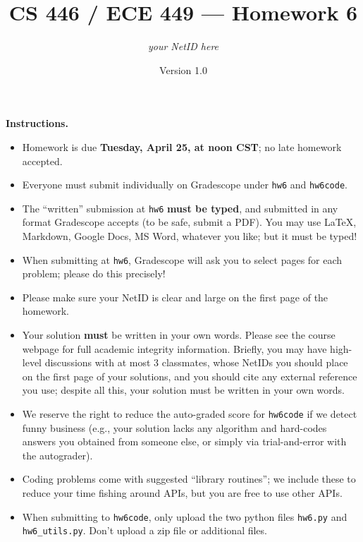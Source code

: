 \documentclass{article}
\title{CS 446 / ECE 449 --- Homework 6}
\author{\emph{your NetID here}}
\date{Version 1.0}
\theoremstyle{definition}
\theoremstyle{remark}
\begin{document}
\maketitle

\noindent\textbf{Instructions.}
\begin{itemize}
  \item
    Homework is due \textbf{Tuesday, April 25, at noon CST}; no late homework accepted.

  \item
    Everyone must submit individually on Gradescope under \texttt{hw6} and \texttt{hw6code}.

  \item
    The ``written'' submission at \texttt{hw6} \textbf{must be typed}, and submitted in
    any format Gradescope accepts (to be safe, submit a PDF).  You may use \LaTeX, Markdown,
    Google Docs, MS Word, whatever you like; but it must be typed!

  \item
    When submitting at \texttt{hw6}, Gradescope will ask you to select pages
    for each problem; please do this precisely!

  \item
    Please make sure your NetID is clear and large on the first page of the homework.

  \item
    Your solution \textbf{must} be written in your own words.
    Please see the course webpage for full academic integrity information.
    Briefly, you may have high-level discussions with at most 3 classmates,
    whose NetIDs you should place on the first page of your solutions,
    and you should cite any external reference you use; despite all this,
    your solution must be written in your own words.

    \item
      We reserve the right to reduce the auto-graded score for
      \texttt{hw6code} if we detect funny business (e.g., your solution
      lacks any algorithm and hard-codes answers you obtained from
      someone else, or simply via trial-and-error with the autograder).

    \item
      Coding problems come with suggested ``library routines''; we include these to reduce
      your time fishing around APIs, but you are free to use other APIs.

    \item
      When submitting to \texttt{hw6code}, only upload the two python files \texttt{hw6.py} and \texttt{hw6\_utils.py}. Don't upload a zip file or additional files.
    
\end{itemize}
\end{document}
